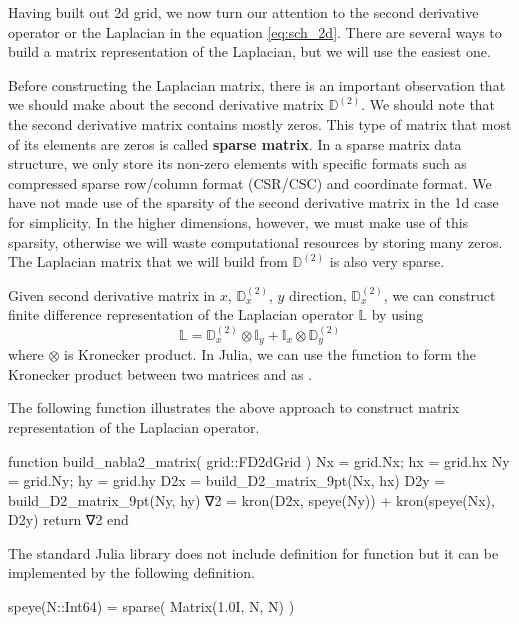 Having built out 2d grid, we now turn our attention to the second derivative operator or
the Laplacian in the equation \ref{eq:sch_2d}.
There are several ways to build a matrix representation of the Laplacian, but we will
use the easiest one. 

Before constructing the Laplacian matrix, there is an important observation that
we should make about the second derivative matrix $\mathbb{D}^{(2)}$. We should note
that the second derivative matrix contains mostly zeros. This type of matrix that
most of its elements are zeros is called \textbf{sparse matrix}.
In a sparse matrix data structure, we only store its non-zero elements with specific
formats such as compressed sparse row/column format (CSR/CSC) and coordinate format.
We have not made use of the sparsity of the second derivative matrix
in the 1d case for simplicity. In the higher dimensions, however,
we must make use of this sparsity, otherwise we will waste computational resources 
by storing many zeros. The Laplacian matrix that we will build from
$\mathbb{D}^{(2)}$ is also very sparse.

Given second derivative matrix in $x$, $\mathbb{D}^{(2)}_{x}$,
$y$ direction, $\mathbb{D}^{(2)}_{x}$,
we can construct finite difference representation of the Laplacian operator
$\mathbb{L}$ by using
%
\begin{equation}
\mathbb{L} = \mathbb{D}^{(2)}_{x} \otimes \mathbb{I}_{y} +
\mathbb{I}_{x} \otimes \mathbb{D}^{(2)}_{y}
\end{equation}
%
where $\otimes$ is Kronecker product.
In Julia, we can use the function  to form the Kronecker product
between two matrices  and  as .

The following function illustrates the above approach to construct matrix
representation of the Laplacian operator.
\begin{juliacode}
function build_nabla2_matrix( grid::FD2dGrid )
    Nx = grid.Nx; hx = grid.hx
    Ny = grid.Ny; hy = grid.hy
    D2x = build_D2_matrix_9pt(Nx, hx)
    D2y = build_D2_matrix_9pt(Ny, hy)
    ∇2 = kron(D2x, speye(Ny)) + kron(speye(Nx), D2y)
    return ∇2
end
\end{juliacode}

The standard Julia library does not include definition for  function
but it can be implemented by the following definition.
\begin{juliacode}
speye(N::Int64) = sparse( Matrix(1.0I, N, N) )
\end{juliacode}

